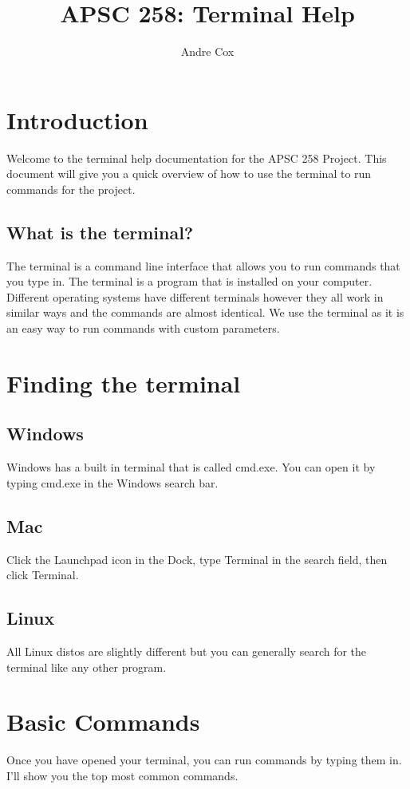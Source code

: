 \documentclass[11pt]{report}
\title{APSC 258: Terminal Help}
\author{Andre Cox}
\begin{document}
\maketitle
\tableofcontents
\pagebreak
\chapter{Introduction}
Welcome to the terminal help documentation for the APSC 258 Project. This document will give you a quick overview of how to use the terminal to run commands for the project.

\section{What is the terminal?}
The terminal is a command line interface that allows you to run commands that you type in. The terminal is a program that is installed on your computer. Different operating systems have different terminals however they all work in similar ways and the commands are almost identical. We use the terminal as it is an easy way to run commands with custom parameters.

\chapter{Finding the terminal}
\section{Windows}
Windows has a built in terminal that is called cmd.exe.
You can open it by typing cmd.exe in the Windows search bar.
\section{Mac}
Click the Launchpad icon in the Dock, type Terminal in the search field, then click Terminal.
\section{Linux}
All Linux distos are slightly different but you can generally search for the terminal like any other program.

\chapter{Basic Commands}
Once you have opened your terminal, you can run commands by typing them in. I'll show you the top most common commands.
\end{document}
